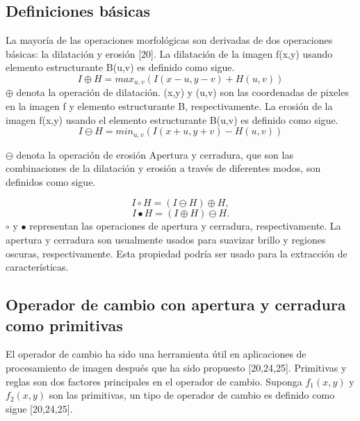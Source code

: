 \documentclass[a4paper, 11 pt, conference]{ieeeconf}      %
\begin{document}
\subsection{Definiciones b\'asicas}

La mayor\'ia de las operaciones morfol\'ogicas son derivadas de dos operaciones b\'asicas: la dilataci\'on y erosi\'on [20]. La dilataci\'on de la imagen f(x,y) usando elemento estructurante B(u,v) es definido como sigue.
$$
I\oplus H = max_{u,v}(I(x-u,y-v) + H(u,v)) 
$$
\( \oplus \) denota la operaci\'on de dilataci\'on. (x,y) y (u,v) son las coordenadas de pixeles en la imagen f y elemento estructurante B, respectivamente. La erosi\'on de la imagen f(x,y) usando el elemento estructurante B(u,v) es definido como sigue.
$$
I \ominus H = min_{u,v}(I(x+u,y+v)-H(u,v))
$$

\( \ominus \) denota la  operaci\'on de erosi\'on 
Apertura y cerradura, que son las combinaciones de la dilataci\'on y erosi\'on a trav\'es de diferentes modos, son definidos como sigue.

$$
I \circ H = (I \ominus H) \oplus H,
$$
$$
I \bullet H = (I \oplus H) \ominus H.
$$
$ \circ $ y $ \bullet $ representan las operaciones de apertura y cerradura, respectivamente.
La apertura y cerradura son usualmente usados para suavizar brillo y regiones oscuras, respectivamente. Esta propiedad podr\'ia ser usado para la extracci\'on de caracter\'isticas.

\subsection{Operador de cambio con apertura y cerradura como primitivas}

El operador de cambio ha sido una herramienta \'util en aplicaciones de procesamiento de imagen despu\'es que ha sido propuesto [20,24,25]. Primitivas y reglas son dos factores principales en el operador de cambio. Suponga $ f_1(x,y) $ y $ f_2(x,y) $ son las primitivas, un tipo de operador de cambio es definido como sigue [20,24,25].
\end{document}
